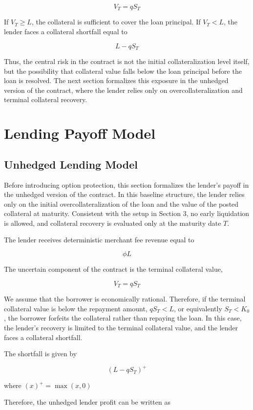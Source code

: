 \documentclass[11pt]{article}
\begin{document}
$$
V_T = qS_T
$$

If $V_T \geq L$, the collateral is sufficient to cover the loan principal. If $V_T < L$, the lender faces a collateral shortfall equal to

$$
L - qS_T
$$

Thus, the central risk in the contract is not the initial collateralization level itself, but the possibility that collateral value falls below the loan principal before the loan is resolved. The next section formalizes this exposure in the unhedged version of the contract, where the lender relies only on overcollateralization and terminal collateral recovery.


\section{Lending Payoff Model}

\subsection{Unhedged Lending Model}

Before introducing option protection, this section formalizes the lender’s payoff in the unhedged version of the contract. In this baseline structure, the lender relies only on the initial overcollateralization of the loan and the value of the posted collateral at maturity. Consistent with the setup in Section 3, no early liquidation is allowed, and collateral recovery is evaluated only at the maturity date $T$.

The lender receives deterministic merchant fee revenue equal to

$$
\phi L
$$

The uncertain component of the contract is the terminal collateral value,

$$
V_T = qS_T
$$

We assume that the borrower is economically rational. Therefore, if the terminal collateral value is below the repayment amount, $qS_T < L$, or equivalently $S_T < K_0$, the borrower forfeits the collateral rather than repaying the loan. In this case, the lender’s recovery is limited to the terminal collateral value, and the lender faces a collateral shortfall.

The shortfall is given by

$$
(L - qS_T)^+
$$

where $(x)^+ = \max(x, 0)$

Therefore, the unhedged lender profit can be written as
\end{document}
